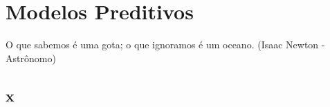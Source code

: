 \chapter{Modelos Preditivos}

\begin{remark}
O que sabemos é uma gota; o que ignoramos é um oceano. (Isaac Newton - Astrônomo) 
\end{remark}

\section{x}

\clearpage

